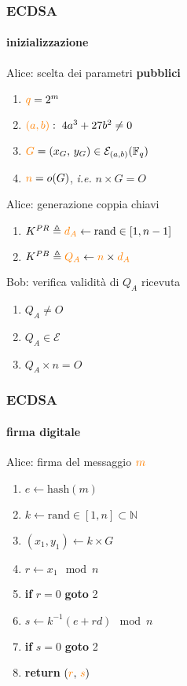 
\begin{frame}
	\frametitle{ECDSA}
	\framesubtitle{inizializzazione}

{\color{blue}Alice}: scelta dei parametri \textbf{pubblici}
	\begin{enumerate}
	  \item ${\color{orange}q}=2^m$
	  \item ${\color{orange}(a,b)}:\;4a^3+27b^2\neq 0$
	  \item ${\color{orange}G}=(x_G,\,y_G) \in \mathcal{E}_{(a,b)}(\mathbb{F}_q)$ 
	  \item ${\color{orange}n}=o(G)$, \textit{i.e.} $n\times G=O$
	\end{enumerate}
{\color{blue}Alice}: generazione coppia chiavi
	\begin{enumerate}
	  \item $K^{PR}\triangleq {\color{orange}d_A}\leftarrow \mathrm{rand} \in[1,n-1]$
	  \item $K^{PB}\triangleq {\color{orange}Q_A} \leftarrow {\color{orange}n}\times {\color{orange}d_A}$
	\end{enumerate}
{\color{blue}Bob}: verifica validità di $Q_A$ ricevuta
	\begin{enumerate}
	  \item $Q_A\neq O$
	  \item $Q_A\in \mathcal{E}$
	  \item $Q_A\times n=O$
	\end{enumerate}
\end{frame}
\begin{frame}
\frametitle{ECDSA}
\framesubtitle{firma digitale}

	{\color{blue}Alice}: firma del messaggio ${\color{orange}m}$ 
	\begin{enumerate}
	  \item $e \leftarrow \mathrm{hash}(m)$  %
	  \item $k \leftarrow \mathrm{rand} \in [1,n] \subset \mathbb{N}$
	  \item $(x_1,y_1) \leftarrow k \times G$
	  \item $r \leftarrow x_1\mod n$ %
	  \item \textbf{if} $r=0$ \textbf{goto} 2
	  \item $s \leftarrow k^{-1}(e+rd) \mod n$ %
	  \item \textbf{if} $s=0$ \textbf{goto} 2
	  \item \textbf{return} $({\color{orange}r},\,{\color{orange}s})$
	\end{enumerate}
\end{frame}
